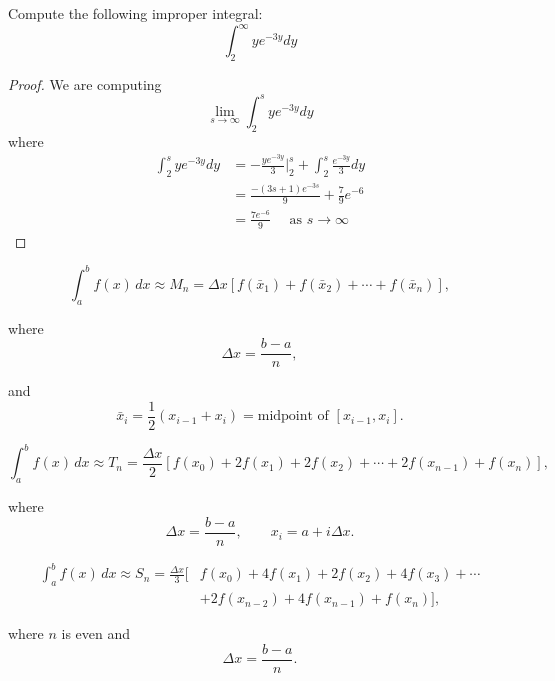 \documentclass[openany]{book}
\begin{document}
\begin{prob}
    Compute the following improper integral:
    \begin{equation*}
        \int_2^\infty ye^{-3y}dy
    \end{equation*}
\end{prob}
\begin{proof}
    We are computing 
    \begin{equation*}
        \lim_{s\to\infty}\int_2^s ye^{-3y}dy
    \end{equation*}
    where
    \begin{align*}
        \int_2^s ye^{-3y}dy&=-\frac{ye^{-3y}}{3}\bigg\vert_2^s+\int_2^s\frac{e^{-3y}}{3}dy\\
        &=\frac{-(3s+1)e^{-3s}}{9}+\frac{7}{9}e^{-6}\\
        &=\frac{7e^{-6}}{9} \quad \text{ as } s\to\infty
    \end{align*}
\end{proof}


\begin{defn}
    \[
        \int_a^b f(x)\,dx
        \approx M_n
        = \Delta x \left[
        f(\bar{x}_1)+f(\bar{x}_2)+\cdots+f(\bar{x}_n)
        \right],
        \]
        
        where
        \[
        \Delta x = \frac{b-a}{n},
        \]
        
        and
        \[
        \bar{x}_i = \frac{1}{2}(x_{i-1}+x_i)
        = \text{midpoint of }[x_{i-1},x_i].
        \]
\end{defn}

\begin{defn}
\[
    \int_a^b f(x)\,dx
    \approx T_n
    = \frac{\Delta x}{2}
    \left[
    f(x_0)+2f(x_1)+2f(x_2)+\cdots
    +2f(x_{n-1})+f(x_n)
    \right],
    \]
    
    where
    \[
    \Delta x = \frac{b-a}{n},
    \qquad
    x_i = a+i\Delta x.
    \]
\end{defn}


\begin{defn}
    \[
\begin{aligned}
\int_a^b f(x)\,dx
\approx S_n
= \frac{\Delta x}{3}\big[
&f(x_0)+4f(x_1)+2f(x_2)+4f(x_3)+\cdots\\
&+2f(x_{n-2})+4f(x_{n-1})+f(x_n)
\big],
\end{aligned}
\]

where \(n\) is even and
\[
\Delta x = \frac{b-a}{n}.
\]
\end{defn}
\end{document}
